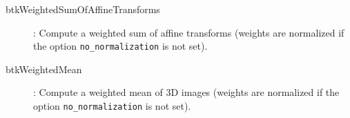 \begin{description}
\item[btkWeightedSumOfAffineTransforms]: Compute a weighted sum of affine transforms (weights are normalized if the option \texttt{no\_normalization} is not set).
\item[btkWeightedMean]: Compute a weighted mean of 3D images (weights are normalized if the option \texttt{no\_normalization} is not set).



\end{description}
